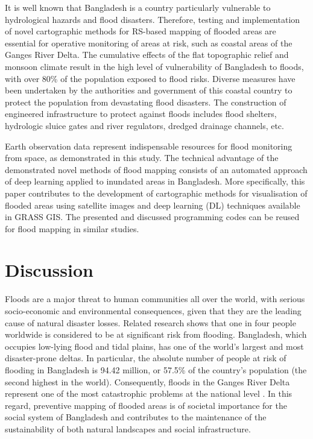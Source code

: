 \documentclass[water,article,accept,pdftex,oneauhor]{Definitions/mdpi}
\begin{document}
It is well known that Bangladesh is a country particularly vulnerable to hydrological hazards and flood disasters. Therefore, testing and implementation of novel cartographic methods for RS-based mapping of flooded areas are essential for operative monitoring of areas at risk, such as coastal areas of the Ganges River Delta. The cumulative effects of the flat topographic relief and monsoon climate result in the high level of vulnerability of Bangladesh to floods, with over 80\% of the population exposed to flood risks. Diverse measures have been undertaken by the authorities and government of this coastal country to protect the population from devastating flood disasters. {The} construction of engineered infrastructure to protect against floods includes flood shelters, hydrologic sluice gates and river regulators, dredged drainage channels, etc.%
 

{Earth} observation data represent{ indispensable} resources for flood monitoring from space, as demonstrated in this study. {The technical} advantage of the demonstrated novel methods of flood mapping consists of an automated approach of deep learning applied to inundated areas in Bangladesh. {More specifically}, this paper contributes to the development of cartographic methods for visualisation of flooded areas using satellite images and deep learning (DL) techniques available in GRASS GIS. The presented and discussed programming codes can be reused {for} flood mapping in similar studies. 

\section{Discussion}

Floods are a major threat to human communities all over the world, with serious socio-economic and environmental consequences, given that they are the leading cause of natural disaster losses. Related research shows that one in four people worldwide is considered to be at significant risk from flooding. Bangladesh, which occupies low-lying flood and tidal plains, has one of the world's largest and most disaster-prone deltas. {In particular}, the absolute number of people at risk of flooding {in Bangladesh} is 94.42 million, or 57.5\% of the country's population (the second highest in the world). {Consequently, }floods in the Ganges River Delta represent one of the most catastrophic problems at the national level \cite{Szabo}. In this regard, preventive mapping of flooded areas is of societal importance for the social system of Bangladesh and {contributes to }the maintenance of the sustainability of both natural landscapes and social infrastructure. 
\end{document}
